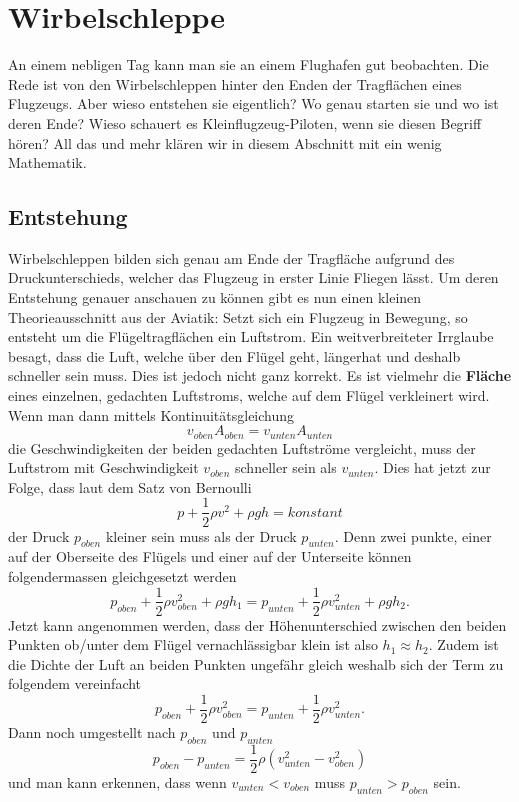 \section{Wirbelschleppe}
An einem nebligen Tag kann man sie an einem Flughafen gut beobachten. 
Die Rede ist von den Wirbelschleppen hinter den Enden der Tragflächen eines Flugzeugs.
Aber wieso entstehen sie eigentlich? 
Wo genau starten sie und wo ist deren Ende?
Wieso schauert es Kleinflugzeug-Piloten, wenn sie diesen Begriff hören?
All das und mehr klären wir in diesem Abschnitt mit ein wenig Mathematik.

\subsection{Entstehung}
Wirbelschleppen bilden sich genau am Ende der Tragfläche aufgrund des Druckunterschieds, welcher das Flugzeug in erster Linie Fliegen lässt.
Um deren Entstehung genauer anschauen zu können gibt es nun einen kleinen Theorieausschnitt aus der Aviatik:
Setzt sich ein Flugzeug in Bewegung, so entsteht um die Flügeltragflächen ein Luftstrom.
Ein weitverbreiteter Irrglaube besagt, dass die Luft, welche über den Flügel geht, \glqq länger\grqq hat und deshalb schneller sein muss.
Dies ist jedoch nicht ganz korrekt.
Es ist vielmehr die \textbf{Fläche} eines einzelnen, gedachten Luftstroms, welche auf dem Flügel verkleinert wird.%
Wenn man dann mittels Kontinuitätsgleichung
\[v_{oben}A_{oben} = v_{unten}A_{unten}\]
die Geschwindigkeiten der beiden gedachten Luftströme vergleicht, muss der Luftstrom mit Geschwindigkeit $v_{oben}$ schneller sein als $v_{unten}$.
Dies hat jetzt zur Folge, dass laut dem Satz von Bernoulli 
\[p+\frac{1}{2}\rho v^2+\rho gh=konstant\]
der Druck $p_{oben}$ kleiner sein muss als der Druck $p_{unten}$.
Denn zwei punkte, einer auf der Oberseite des Flügels und einer auf der Unterseite können folgendermassen gleichgesetzt werden
\[p_{oben}+\frac{1}{2}\rho v^2_{oben} + \rho gh_1 = p_{unten}+\frac{1}{2}\rho v^2_{unten}+\rho gh_2.\]
Jetzt kann angenommen werden, dass der Höhenunterschied zwischen den beiden Punkten ob/unter dem Flügel vernachlässigbar klein ist also \(h_1\approx h_2\).
Zudem ist die Dichte der Luft an beiden Punkten ungefähr gleich weshalb sich der Term zu folgendem vereinfacht
\[p_{oben}+\frac{1}{2}\rho v^2_{oben} = p_{unten}+\frac{1}{2}\rho v^2_{unten}.\]
Dann noch umgestellt nach $p_{oben}$ und $p_{unten}$
\[p_{oben}-p_{unten} = \frac{1}{2}\rho( v^2_{unten}-v^2_{oben})\]
und man kann erkennen, dass wenn $v_{unten} < v_{oben}$ muss $p_{unten} > p_{oben}$ sein.
